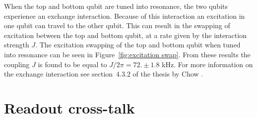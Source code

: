       When the top and bottom qubit are tuned into resonance, the two qubits experience an exchange interaction. Because of this interaction an excitation in one qubit can travel to the other qubit. This can result in the swapping of excitation between the top and bottom qubit, at a rate given by the interaction strength $J$. The excitation swapping of the top and bottom qubit when tuned into resonance can be seen in Figure~\ref{fig:excitation swap}. From these results the coupling $J$ is found to be equal to $J/2\pi=72. \pm 1.8$ kHz. For more information on the exchange interaction see section~4.3.2 of the thesis by Chow \cite{Chow}.

    \section{Readout cross-talk}
      \label{sec:readout cross-talk}





